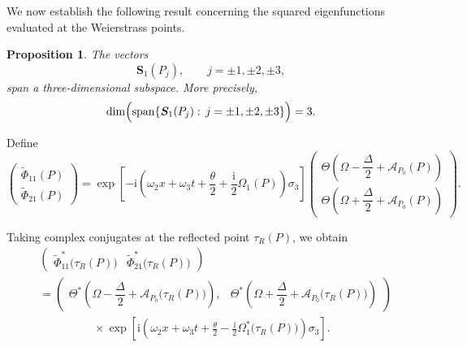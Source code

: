 \documentclass{amsart}
\newtheorem{prop}{Proposition}
\newcounter{hw}
\numberwithin{equation}{hw}
\begin{document}
We now establish the following result concerning the squared eigenfunctions evaluated at the Weierstrass points.

\begin{prop}\label{prop:hw2}
The vectors
\[
\bm{S}_1(P_j),
\qquad
j=\pm1,\pm2,\pm3,
\]
span a three-dimensional subspace. More precisely,
\begin{equation}
\dim
\Bigl(
\operatorname{span}
\{
\bm{S}_1(P_j)
:\,
j=\pm1,\pm2,\pm3
\}
\Bigr)
=
3.
\label{eq:span-dimension-prop}
\end{equation}
\end{prop}


Define
\begin{equation}
\begin{pmatrix}
\widetilde{\Phi}_{11}(P)\\[4pt]
\widetilde{\Phi}_{21}(P)
\end{pmatrix}
=
\exp\!\left[
-
\mathrm{i}
\left(
\omega_2x+\omega_3t+\frac{\theta}{2}
+\frac{\mathrm{i}}{2}\Omega_1(P)
\right)
\sigma_3
\right]
\begin{pmatrix}
\Theta\!\left(
\Omega-\dfrac{\Delta}{2}
+\mathcal{A}_{P_0}(P)
\right)
\\[8pt]
\Theta\!\left(
\Omega+\dfrac{\Delta}{2}
+\mathcal{A}_{P_0}(P)
\right)
\end{pmatrix}.
\label{eq:tilde-Phi}
\end{equation}

Taking complex conjugates at the reflected point \(\tau_R(P)\), we obtain
\begin{align}
&
\begin{pmatrix}
\widetilde{\Phi}_{11}^*\bigl(\tau_R(P)\bigr)
&
\widetilde{\Phi}_{21}^*\bigl(\tau_R(P)\bigr)
\end{pmatrix}
\nonumber\\[4pt]
&=
\begin{pmatrix}
\Theta^*\!\left(
\Omega-\dfrac{\Delta}{2}
+\mathcal{A}_{P_0}\bigl(\tau_R(P)\bigr)
\right),
&
\Theta^*\!\left(
\Omega+\dfrac{\Delta}{2}
+\mathcal{A}_{P_0}\bigl(\tau_R(P)\bigr)
\right)
\end{pmatrix}
\nonumber\\[4pt]
&\hspace{2cm}\times
\exp\!\left[
\mathrm{i}
\left(
\omega_2x+\omega_3t+\frac{\theta}{2}
-
\frac{\mathrm{i}}{2}\Omega_1^*\bigl(\tau_R(P)\bigr)
\right)
\sigma_3
\right].
\label{eq:tilde-Phi-conjugate}
\end{align}
\end{document}
